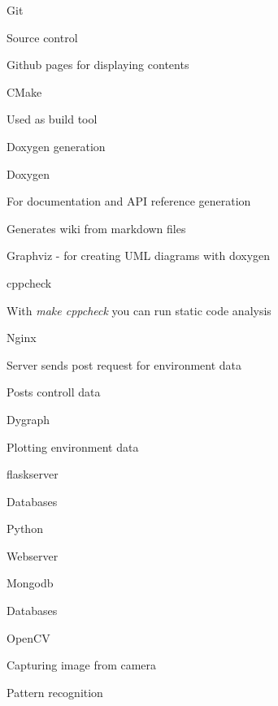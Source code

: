 \begin{DoxyItemize}
\item Git
\begin{DoxyItemize}
\item Source control
\item Github pages for displaying contents
\end{DoxyItemize}
\item C\+Make
\begin{DoxyItemize}
\item Used as build tool
\item Doxygen generation
\end{DoxyItemize}
\item Doxygen
\begin{DoxyItemize}
\item For documentation and A\+PI reference generation
\item Generates wiki from markdown files
\item Graphviz -\/ for creating U\+ML diagrams with doxygen
\end{DoxyItemize}
\item cppcheck
\begin{DoxyItemize}
\item With {\itshape make cppcheck} you can run static code analysis
\end{DoxyItemize}
\item Nginx
\begin{DoxyItemize}
\item Server sends post request for environment data
\item Posts controll data
\end{DoxyItemize}
\item Dygraph
\begin{DoxyItemize}
\item Plotting environment data
\end{DoxyItemize}
\item flaskserver
\begin{DoxyItemize}
\item Databases
\end{DoxyItemize}
\item Python
\begin{DoxyItemize}
\item Webserver
\end{DoxyItemize}
\item Mongodb
\begin{DoxyItemize}
\item Databases
\end{DoxyItemize}
\item Open\+CV
\begin{DoxyItemize}
\item Capturing image from camera
\item Pattern recognition 
\end{DoxyItemize}
\end{DoxyItemize}